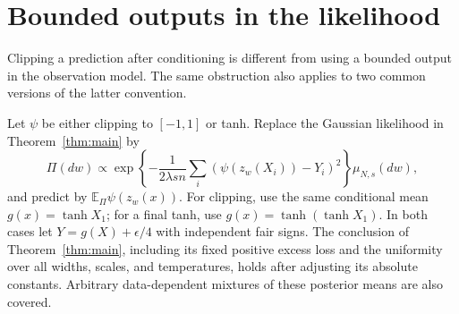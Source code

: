 \section{Bounded outputs in the likelihood}
\label{sec:bounded-output-likelihood}
Clipping a prediction after conditioning is different from using a bounded output in the observation model. The same obstruction also applies to two common versions of the latter convention.

\begin{corollary}
\label{cor:bounded-output-likelihood}
Let $\psi$ be either clipping to $[-1,1]$ or tanh. Replace the Gaussian likelihood in Theorem~\ref{thm:main} by
\[
 \Pi(dw)\propto\exp\left\{-\frac1{2\lambda s n}
              \sum_i(\psi(z_w(X_i))-Y_i)^2\right\}\mu_{N,s}(dw),
\]
and predict by $\mathbb E_\Pi\psi(z_w(x))$. For clipping, use the same conditional mean $g(x)=\tanh X_1$; for a final tanh, use $g(x)=\tanh(\tanh X_1)$. In both cases let $Y=g(X)+\epsilon/4$ with independent fair signs. The conclusion of Theorem~\ref{thm:main}, including its fixed positive excess loss and the uniformity over all widths, scales, and temperatures, holds after adjusting its absolute constants. Arbitrary data-dependent mixtures of these posterior means are also covered.
\end{corollary}
